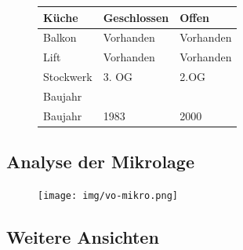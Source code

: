 \documentclass{article}
\begin{document}
\begin{figure}[!htbp]
\begin{minipage}[c]{0.44\textwidth}
\begin{flushleft}
\begin{tabular}{ |l|l|l| }
					\hline
					Küche & \cellcolor{lightgray} Geschlossen & Offen\\ 
					\hline
					Balkon & \cellcolor{lightgray} Vorhanden & Vorhanden\\ 
					\hline
					Lift & \cellcolor{lightgray} Vorhanden & Vorhanden\\ 
					\hline
					Stockwerk & \cellcolor{lightgray} 3. OG & 2.OG\\ 
					\hline
					\rowcolor{gray} Baujahr & &\\
					\hline
					Baujahr & \cellcolor{lightgray} 1983 & 2000\\
					\hline
				\end{tabular}
			\end{flushleft}
		\end{minipage}
	\end{figure}

	\clearpage
	\subsection{Analyse der Mikrolage}
	\begin{figure}[!htbp]
		\centering
		\texttt{[image: img/vo-mikro.png]}
	\end{figure}

	\clearpage
	\subsection{Weitere Ansichten}
\end{document}
